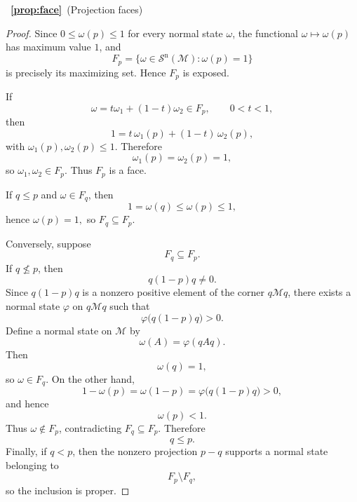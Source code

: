 \documentclass[11pt]{article}
\newcommand{\Sn}{\mathcal{S}^{\mathrm n}}
\begin{document}
~{\bf \ref{prop:face}}~(Projection faces)
\begin{proof}
Since
$
0\le \omega(p)\le 1
$
for every normal state $\omega$, the functional
$
\omega\mapsto\omega(p)
$
has maximum value $1$, and
\[
F_p
=
\{\omega\in\Sn(\mathcal M):\omega(p)=1\}
\]
is precisely its maximizing set. Hence $F_p$ is exposed.

If
\[
\omega=t\omega_1+(1-t)\omega_2\in F_p,
\qquad
0<t<1,
\]
then
\[
1
=
t\,\omega_1(p)+(1-t)\,\omega_2(p),
\]
with
$
\omega_1(p),\omega_2(p)\le 1.
$
Therefore
\[
\omega_1(p)=\omega_2(p)=1,
\]
so
$
\omega_1,\omega_2\in F_p.
$
Thus $F_p$ is a face.

If $q\le p$ and $\omega\in F_q$, then
\[
1=\omega(q)\le\omega(p)\le1,
\]
hence
$
\omega(p)=1,
$
so
$
F_q\subseteq F_p.
$

Conversely, suppose
\[
F_q\subseteq F_p.
\]
If $q\not\le p$, then
\[
q(1-p)q\neq0.
\]
Since $q(1-p)q$ is a nonzero positive element of the corner
$q\mathcal Mq$, there exists a normal state $\varphi$ on
$q\mathcal Mq$ such that
\[
\varphi\bigl(q(1-p)q\bigr)>0.
\]
Define a normal state on $\mathcal M$ by
\[
\omega(A)=\varphi(qAq).
\]
Then
\[
\omega(q)=1,
\]
so $\omega\in F_q$. On the other hand,
\[
1-\omega(p)
=
\omega(1-p)
=
\varphi\bigl(q(1-p)q\bigr)
>0,
\]
and hence
\[
\omega(p)<1.
\]
Thus $\omega\notin F_p$, contradicting
$F_q\subseteq F_p$. Therefore
\[
q\le p.
\]
Finally, if $q<p$, then the nonzero projection
$
p-q
$
supports a normal state belonging to
\[
F_p\setminus F_q,
\]
so the inclusion is proper.
\end{proof}
\end{document}
